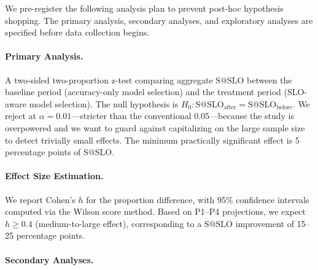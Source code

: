 \documentclass[11pt]{article}
\makeatletter
\newcommand{\sslo}{\ensuremath{\mathrm{S@SLO}}}
\makeatother
\begin{document}
We pre-register the following analysis plan to prevent post-hoc hypothesis shopping. The primary analysis, secondary analyses, and exploratory analyses are specified before data collection begins.

\paragraph{Primary Analysis.} A two-sided two-proportion z-test comparing aggregate $\sslo{}$ between the baseline period (accuracy-only model selection) and the treatment period (SLO-aware model selection). The null hypothesis is $H_0: \sslo{}_{\text{after}} = \sslo{}_{\text{before}}$. We reject at $\alpha = 0.01$---stricter than the conventional 0.05---because the study is overpowered and we want to guard against capitalizing on the large sample size to detect trivially small effects. The minimum practically significant effect is 5 percentage points of $\sslo{}$.

\paragraph{Effect Size Estimation.} We report Cohen's $h$ for the proportion difference, with 95\% confidence intervals computed via the Wilson score method. Based on P1--P4 projections, we expect $h \geq 0.4$ (medium-to-large effect), corresponding to a $\sslo{}$ improvement of 15--25 percentage points.

\paragraph{Secondary Analyses.}
\end{document}
